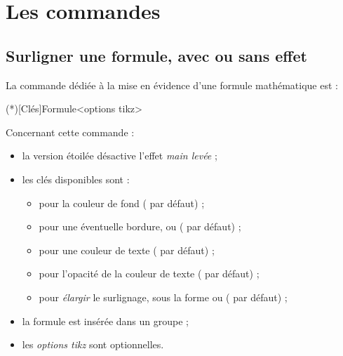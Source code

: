 \documentclass[french,11pt,a4paper]{article}
\begin{document}
%

\pagebreak

\section{Les commandes}

\subsection{Surligner une formule, avec  ou sans effet}

La commande dédiée à la mise en évidence d'une formule mathématique est  :

\begin{codehigh}[language=latex/latex2,style/main=cyan!10,style/code=cyan!10]
\SurlignerFormule(*)[Clés]{Formule}<options tikz>
\end{codehigh}

Concernant cette commande :

\begin{itemize}
	\item la version étoilée désactive l'effet \textit{main levée} ;
	\item les clés disponibles sont :
	\begin{itemize}
		\item {} pour la couleur de fond ( par défaut) ;
		\item {} pour une éventuelle bordure,  ou  ( par défaut) ;
		\item {} pour une couleur de texte ( par défaut) ;
		\item {} pour l'opacité de la couleur de texte ( par défaut) ;
		\item {} pour \textit{élargir} le surlignage, sous la forme  ou  (\MontreCode{1pt/2pt} par défaut) ;
	\end{itemize}
	\item la formule est insérée dans un groupe  ;
	\item les \textit{options tikz} sont optionnelles.
\end{itemize}
\end{document}
